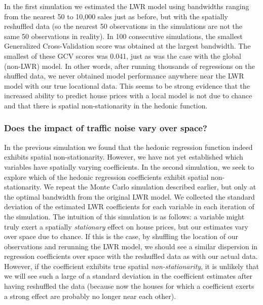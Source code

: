 \documentclass{article}\usepackage{graphicx, color}
\begin{document}
In the first simulation we estimated the LWR model using bandwidths ranging from the nearest 50 to 10,000 sales just as before, but with the spatially reshuffled data (so the nearest 50 observations in the simulations are not the same 50 observations in reality). In 100 consecutive simulations, the smallest Generalized Cross-Validation score was obtained at the largest bandwidth. The smallest of these GCV scores was 0.041, just as was the case with the global (non-LWR) model. In other words, after running thousands of regressions on the shuffled data, we never obtained model performance anywhere near the LWR model with our true locational data. This seems to be strong evidence that the increased ability to predict house prices with a local model is not due to chance and that there is spatial non-stationarity in the hedonic function.

\subsubsection{Does the impact of traffic noise vary over space?}
In the previous simulation we found that the hedonic regression function indeed exhibits spatial non-stationarity. However, we have not yet established which variables have spatially varying coefficients. In the second simulation, we seek to explore which of the hedonic regression coefficients exhibit spatial non-stationarity. We repeat the Monte Carlo simulation described earlier, but only at the optimal bandwidth from the original LWR model. We collected the standard deviation of the estimated LWR coefficients for each variable in each iteration of the simulation. The intuition of this simulation is as follows: a variable might truly exert a spatially \emph{stationary} effect on house prices, but our estimates vary over space due to chance. If this is the case, by shuffling the location of our observations and rerunning the LWR model, we should see a similar dispersion in regression coefficients over space with the reshuffled data as with our actual data. However, if the coefficient exhibits true spatial \emph{non-stationarity}, it is unlikely that we will see such a large of a standard deviation in the coefficient estimates after having reshuffled the data (because now the houses for which a coefficient exerts a strong effect are probably no longer near each other). 
\end{document}
